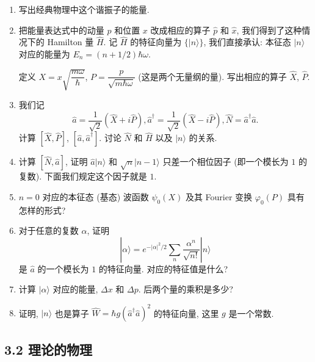 \begin{enumerate}
    \item 写出经典物理中这个谐振子的能量.
    \item 把能量表达式中的动量 $p$ 和位置 $x$ 改成相应的算子 $\hat{p}$ 和 $\hat{x}$, 
    我们得到了这种情况下的 Hamilton 量 $\hat{H}$. 
    记 $\hat{H}$ 的特征向量为 $\{|n\rangle\}$, 
    我们直接承认: 本征态 $|n\rangle$ 对应的能量为 $E_n = (n + 1/2)\hbar \omega$.
    
    定义 $X = x\sqrt{\dfrac{m\omega}{\hbar}}$, 
    $P = \dfrac{p}{\sqrt{m\hbar \omega}}$ (这是两个无量纲的量). 
    写出相应的算子 $\hat{X}$, $\hat{P}$.
    \item 我们记 \[\hat{a} = \frac{1}{\sqrt{2}}\left(\hat{X} + i\hat{P}\right), 
    \hat{a}^\dagger = \frac{1}{\sqrt{2}}\left(\hat{X} - i\hat{P}\right), 
    \hat{N} = \hat{a}^\dagger \hat{a}.\]
    计算 $[\hat{X}, \hat{P}]$, $[\hat{a}, \hat{a}^\dagger]$. 
    讨论 $\hat{N}$ 和 $\hat{H}$ 以及 $|n\rangle$ 的关系.
    \item 计算 $[\hat{N}, \hat{a}]$, 证明 $\hat{a}|n\rangle$ 
    和 $\sqrt{n}|n - 1\rangle$ 只差一个相位因子 (即一个模长为 $1$ 的复数). 
    下面我们规定这个因子就是 $1$.
    \item $n = 0$ 对应的本征态 (基态) 波函数 $\psi_0(X)$ 
    及其 Fourier 变换 $\varphi_0(P)$ 具有怎样的形式?
    \item 对于任意的复数 $\alpha$, 证明 
    \[|\alpha\rangle = e^{-|\alpha|^2/2} 
    \sum_n \frac{\alpha^n}{\sqrt{n!}} |n\rangle\]
    是 $\hat{a}$ 的一个模长为 $1$ 的特征向量. 对应的特征值是什么?
    \item 计算 $|\alpha\rangle$ 对应的能量, $\Delta x$ 和 $\Delta p$. 后两个量的乘积是多少?
    \item 证明, $|n\rangle$ 也是算子 $\hat{W} = \hbar g(\hat{a}^\dagger \hat{a})^2$ 的特征向量, 这里 $g$ 是一个常数.
\end{enumerate}

\subsection*{3.2 理论的物理}

